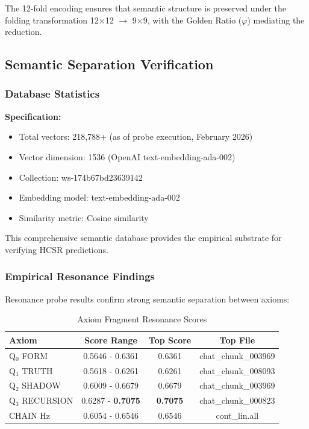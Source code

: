 \documentclass[11pt, letterpaper]{article}
\begin{document}
The 12-fold encoding ensures that semantic structure is preserved under the folding transformation 12$\times$12 $\to$ 9$\times$9, with the Golden Ratio ($\varphi$) mediating the reduction.

\subsection{Semantic Separation Verification}

\subsubsection{Database Statistics}

\textbf{Specification:}
\begin{itemize}
    \item Total vectors: 218,788+ (as of probe execution, February 2026)
    \item Vector dimension: 1536 (OpenAI text-embedding-ada-002)
    \item Collection: ws-174b67bd23639142
    \item Embedding model: text-embedding-ada-002
    \item Similarity metric: Cosine similarity
\end{itemize}

This comprehensive semantic database provides the empirical substrate for verifying HCSR predictions.

\subsubsection{Empirical Resonance Findings}

Resonance probe results confirm strong semantic separation between axioms:

\begin{table}[h]
\centering
\caption{Axiom Fragment Resonance Scores}
\begin{tabular}{lccc}
\toprule
Axiom & Score Range & Top Score & Top File \\
\midrule
Q$_0$ FORM & 0.5646 - 0.6361 & 0.6361 & chat\_chunk\_003969 \\
Q$_1$ TRUTH & 0.5618 - 0.6261 & 0.6261 & chat\_chunk\_008093 \\
Q$_2$ SHADOW & 0.6009 - 0.6679 & 0.6679 & chat\_chunk\_003969 \\
Q$_3$ RECURSION & 0.6287 - \textbf{0.7075} & \textbf{0.7075} & chat\_chunk\_000823 \\
CHAIN Hz & 0.6054 - 0.6546 & 0.6546 & cont\_lin.all \\
\bottomrule
\end{tabular}
\end{table}
\end{document}
